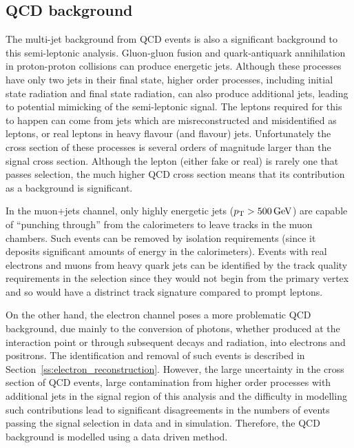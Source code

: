 \subsection{QCD background}
\label{ss:qcd}
The multi-jet background from QCD events is also a significant background to this semi-leptonic \ttbar
analysis. Gluon-gluon fusion and quark-antiquark annihilation in proton-proton collisions can produce
energetic jets. Although these processes have only two jets in their final state, higher order processes,
including initial state radiation and final state radiation, can also produce additional jets, leading to
potential mimicking of the semi-leptonic \ttbar signal. The leptons required for this to happen can come from
jets which are misreconstructed and misidentified as leptons, or real leptons in heavy flavour (\cPqb and
\cPqc flavour) jets. Unfortunately the cross section of these processes is several orders of magnitude larger
than the signal cross section. Although the lepton (either fake or real) is rarely one that passes selection,
the much higher QCD cross section means that its contribution as a background is significant.

In the muon+jets channel, only highly energetic jets ($p_{\mathrm{T}}>500\,\text{Ge\hspace{-.08em}V}$) are capable of ``punching through'' from
the calorimeters to leave tracks in the muon chambers. Such events can be removed by isolation requirements
(since it deposits significant amounts of energy in the calorimeters). Events with real electrons and muons
from heavy quark jets can be identified by the track quality requirements in the selection since they would
not begin from the primary vertex and so would have a distrinct track signature compared to prompt leptons.

On the other hand, the electron channel poses a more problematic QCD background, due mainly to the conversion
of photons, whether produced at the interaction point or through subsequent decays and radiation, into
electrons and positrons. The identification and removal of such events is described in
Section~\ref{ss:electron_reconstruction}. However, the large uncertainty in the cross section of QCD events,
large contamination from higher order processes with additional jets in the signal region of this analysis and
the difficulty in modelling such contributions lead to significant disagreements in the numbers
of events passing the signal selection in data and in simulation. Therefore, the QCD background is modelled
using a data driven method.

